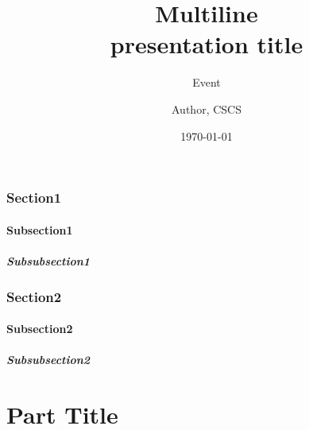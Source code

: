 \documentclass[aspectratio=1610]{beamer}
\author{Author, CSCS}
\title{Multiline \\ presentation title}
\subtitle{Event}
\date{\today}
\begin{document}
\cscstitle

\begin{frame}
\end{frame}


\section{Section1}
\subsection{Subsection1}
\subsubsection{Subsubsection1}

\section{Section2}
\subsection{Subsection2}
\subsubsection{Subsubsection2}

\part{Part Title}
\end{document}
